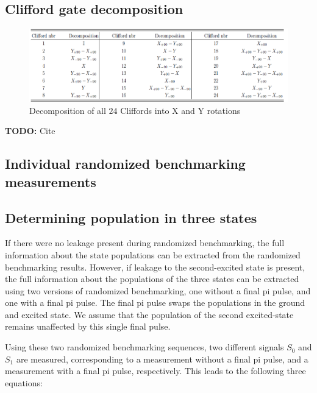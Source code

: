     \subsection{Clifford gate decomposition}
      \label{ssec:Clifford gate decomposition}

      \begin{figure}[tb]
        \centering
        \includegraphics[width=\textwidth]{../Figures/Clifford decomposition.png}
        \caption{Decomposition of all $24$ Cliffords into X and Y rotations}
        \label{fig:Clifford decomposition}
      \end{figure}
      \textbf{TODO:} Cite

    \subsection{Individual randomized benchmarking measurements}
      \label{ssec:Individual randomized benchmarking measurements}

    \subsection{Determining population in three states}
      \label{ssec:Determining population in three states}
      If there were no leakage present during randomized benchmarking, the full information about the state populations can be extracted from the randomized benchmarking results. However, if leakage to the second-excited state is present, the full information about the populations of the three states can be extracted using two versions of randomized benchmarking, one without a final pi pulse, and one with a final pi pulse. The final pi pulse swaps the populations in the ground and excited state. We assume that the population of the second excited-state remains unaffected by this single final pulse.

      Using these two randomized benchmarking sequences, two different signals $S_0$ and $S_1$ are measured, corresponding to a measurement without a final pi pulse, and a measurement with a final pi pulse, respectively. This leads to the following three equations:

